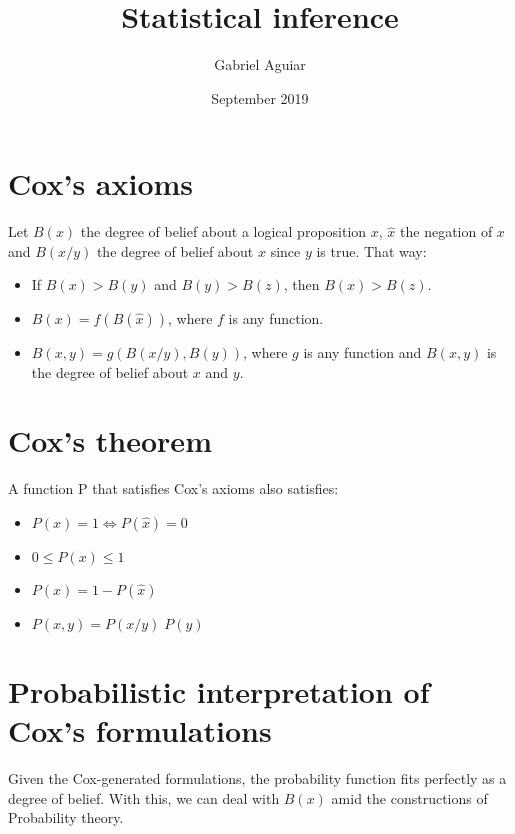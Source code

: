 \documentclass{article}
\title{Statistical inference}
\author{Gabriel Aguiar}
\date{September 2019}
\begin{document}
\maketitle

\section{Cox's axioms}

Let $B(x)$ the degree of belief about a logical proposition $x$, $\hat{x}$ the negation of $x$ and $B(x/y)$ the degree of belief about $x$ since $y$ is true. That way:

\begin{itemize}

\item If $B(x) > B(y)$ and $B(y) > B(z)$, then $B(x) > B(z)$.

\item $B(x) = f(B(\hat{x}))$, where $f$ is any function.

\item $B(x,y) = g(B(x/y),B(y))$, where $g$ is any function and $B(x,y)$ is the degree of belief about $x$ and $y$.

\end{itemize}

\section{Cox's theorem}

A function P that satisfies Cox's axioms also satisfies:

\begin{itemize}

\item $P(x) = 1 \Leftrightarrow P(\hat{x}) = 0$

\item $0 \leq P(x) \leq 1$

\item $P(x) = 1 - P(\hat{x})$

\item $P(x,y) = P(x/y) \; P(y)$

\end{itemize}

\section{Probabilistic interpretation of Cox's formulations}

Given the Cox-generated formulations, the probability function fits perfectly as a degree of belief. With this, we can deal with $B(x)$ amid the constructions of Probability theory.
\end{document}
